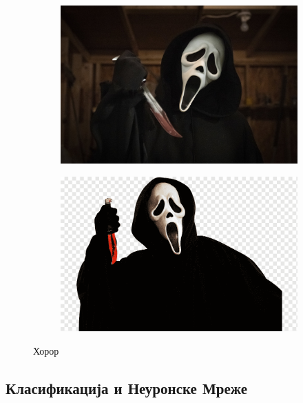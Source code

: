 \documentclass{article}
\begin{document}
\begin{figure}[htbp]
  \centering
  \begin{subfigure}{0.45\textwidth}
    \centering
    \includegraphics[width=\linewidth]{slike/horor.jpg} %
    \caption{}
    \label{fig:slika9}
  \end{subfigure}
  \hfill
  \begin{subfigure}{0.45\textwidth}
    \centering
    \includegraphics[width=\linewidth]{slike/horror.png} %
    \caption{}
    \label{fig:slika10}
  \end{subfigure}
  \caption{Хорор}
  \label{fig:zajednicki_naslov6}
\end{figure}

\newpage
\subsection{Класификација и Неуронске Мреже}
\end{document}

